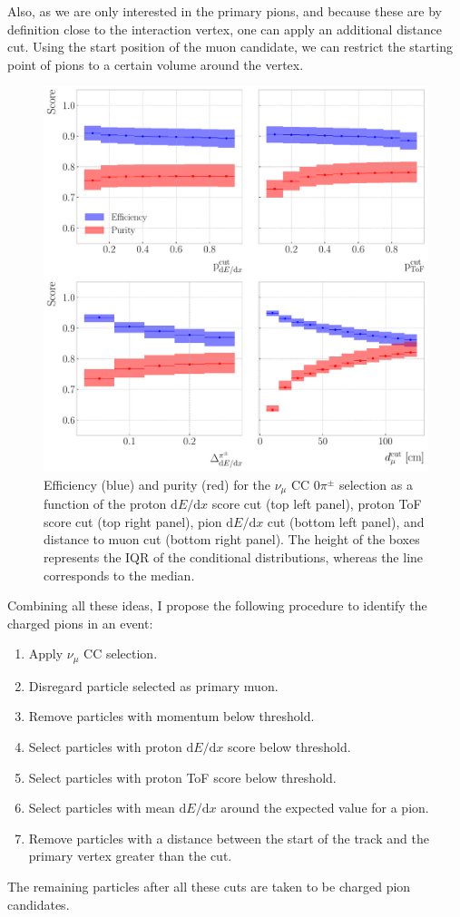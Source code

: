 Also, as we are only interested in the primary pions, and because these are by definition close to the interaction vertex, one can apply an additional distance cut. Using the start position of the muon candidate, we can restrict the starting point of pions to a certain volume around the vertex.

\begin{figure}[t]
    \centering
    \includegraphics[width=.85\linewidth]{Images/GAr_selection/pion_selection_0_pions_metrics.pdf}
    \caption[Efficiency and purity for the $\nu_{\mu}$ CC $0\pi^{\pm}$ selection as a function of the different cuts.]{Efficiency (blue) and purity (red) for the $\nu_{\mu}$ CC $0\pi^{\pm}$ selection as a function of the proton $\mathrm{d}E/\mathrm{d}x$ score cut (top left panel), proton ToF score cut (top right panel), pion $\mathrm{d}E/\mathrm{d}x$ cut (bottom left panel), and distance to muon cut (bottom right panel). The height of the boxes represents the IQR of the conditional distributions, whereas the line corresponds to the median.}
    \label{fig:pion_selection_0_pions_metrics}
\end{figure}

Combining all these ideas, I propose the following procedure to identify the charged pions in an event:
\begin{enumerate}
    \item Apply $\nu_{\mu}$ CC selection.
    \item Disregard particle selected as primary muon.
    \item Remove particles with momentum below threshold.
    \item Select particles with proton $\mathrm{d}E/\mathrm{d}x$ score below threshold.
    \item Select particles with proton ToF score below threshold.
    \item Select particles with mean $\mathrm{d}E/\mathrm{d}x$ around the expected value for a pion.
    \item Remove particles with a distance between the start of the track and the primary vertex greater than the cut.
\end{enumerate}
The remaining particles after all these cuts are taken to be charged pion candidates.

